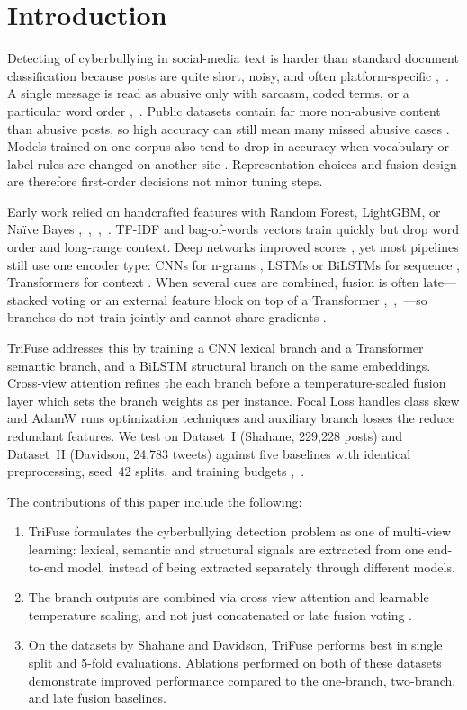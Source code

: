 \section{Introduction}

Detecting of cyberbullying in social-media text is harder than standard document classification because posts are quite short, noisy, and often platform-specific \cite{ref1},~\cite{ref12}. A single message is read as abusive only with sarcasm, coded terms, or a particular word order \cite{ref2},~\cite{ref4}. Public datasets contain far more non-abusive content than abusive posts, so high accuracy can still mean many missed abusive cases \cite{ref23}. Models trained on one corpus also tend to drop in accuracy when vocabulary or label rules are changed on another site \cite{ref13}. Representation choices and fusion design are therefore first-order decisions not minor tuning steps.

Early work relied on handcrafted features with Random Forest, LightGBM, or Na\"ive Bayes \cite{ref2},~\cite{ref5},~\cite{ref6},~\cite{ref18}. TF-IDF and bag-of-words vectors train quickly but drop word order and long-range context. Deep networks improved scores \cite{ref3}, yet most pipelines still use one encoder type: CNNs for n-grams \cite{ref7}, LSTMs or BiLSTMs for sequence \cite{ref8}, Transformers for context \cite{ref9}. When several cues are combined, fusion is often late---stacked voting or an external feature block on top of a Transformer \cite{ref14},~\cite{ref15},~\cite{ref16}---so branches do not train jointly and cannot share gradients \cite{ref19}.

TriFuse addresses this by training a CNN lexical branch and a Transformer semantic branch, and a BiLSTM structural branch on the same embeddings. Cross-view attention refines the each branch before a temperature-scaled fusion layer which sets the branch weights as per instance. Focal Loss handles class skew and AdamW runs optimization techniques and auxiliary branch losses the reduce redundant features. We test on Dataset~I (Shahane, 229,228 posts) \cite{ref10} and Dataset~II (Davidson, 24,783 tweets) \cite{ref11} against five baselines with identical preprocessing, seed~42 splits, and training budgets \cite{ref12},~\cite{ref13}.

The contributions of this paper include the following:
\begin{enumerate}
\item TriFuse formulates the cyberbullying detection problem as one of multi-view learning: lexical, semantic and structural signals are extracted from one end-to-end model, instead of being extracted separately through different models.
\item The branch outputs are combined via cross view attention and learnable temperature scaling, and not just concatenated or late fusion voting \cite{ref14}.
\item On the datasets by Shahane and Davidson, TriFuse performs best in single split and 5-fold evaluations. Ablations performed on both of these datasets demonstrate improved performance compared to the one-branch, two-branch, and late fusion baselines.
\end{enumerate}

